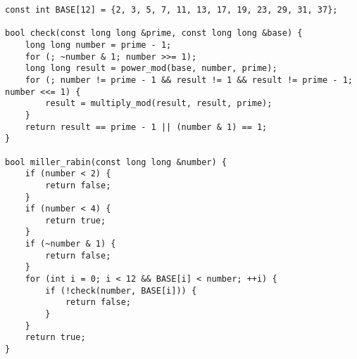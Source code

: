 \begin{lstlisting}
const int BASE[12] = {2, 3, 5, 7, 11, 13, 17, 19, 23, 29, 31, 37};

bool check(const long long &prime, const long long &base) {
    long long number = prime - 1;
    for (; ~number & 1; number >>= 1);
    long long result = power_mod(base, number, prime);
    for (; number != prime - 1 && result != 1 && result != prime - 1; number <<= 1) {
        result = multiply_mod(result, result, prime);
    }
    return result == prime - 1 || (number & 1) == 1;
}

bool miller_rabin(const long long &number) {
    if (number < 2) {
        return false;
    }
    if (number < 4) {
        return true;
    }
    if (~number & 1) {
        return false;
    }
    for (int i = 0; i < 12 && BASE[i] < number; ++i) {
        if (!check(number, BASE[i])) {
            return false;
        }
    }
    return true;
}
\end{lstlisting}
